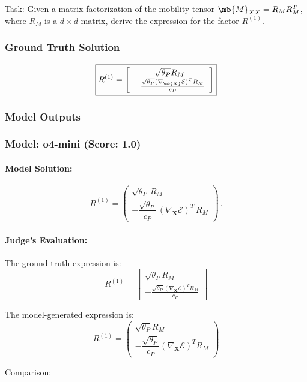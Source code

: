 \documentclass[10pt]{article}
\begin{document}
Task:
Given a matrix factorization of the mobility tensor $\mb{M}_{\tiny XX} = R_M R_M^T$, where $R_M$ is a $d \times d$ matrix, derive the expression for the factor $R^{(1)}$.

\subsubsection*{Ground Truth Solution}
\[ \boxed{R^{(1)} = \left[
\begin{array}{c}
\sqrt{\theta_P}R_M \\
-\frac{\sqrt{\theta_P}(\nabla_{\mb{X}} \mathcal{E})^T R_M}{c_P}
\end{array}
\right]} \]

\subsubsection*{Model Outputs}
\subsubsection*{Model: o4-mini (Score: 1.0)}
\paragraph*{Model Solution:}
\[ R^{(1)}=
\begin{pmatrix}
\sqrt{\theta_P}\,R_M \\[1ex]
-\dfrac{\sqrt{\theta_P}}{c_P}\,(\nabla_{\mathbf X}\mathcal E)^{T}\,R_M
\end{pmatrix}\,. \]

\paragraph*{Judge's Evaluation:}

The ground truth expression is:
\[
R^{(1)} = \left[
\begin{array}{c}
\sqrt{\theta_P} R_M \\
-\frac{\sqrt{\theta_P} (\nabla_{\mathbf{X}} \mathcal{E})^T R_M}{c_P}
\end{array}
\right]
\]

The model-generated expression is:
\[
R^{(1)} =
\begin{pmatrix}
\sqrt{\theta_P} R_M \\[1ex]
-\dfrac{\sqrt{\theta_P}}{c_P} (\nabla_{\mathbf{X}} \mathcal{E})^{T} R_M
\end{pmatrix}
\]

Comparison:
\end{document}
